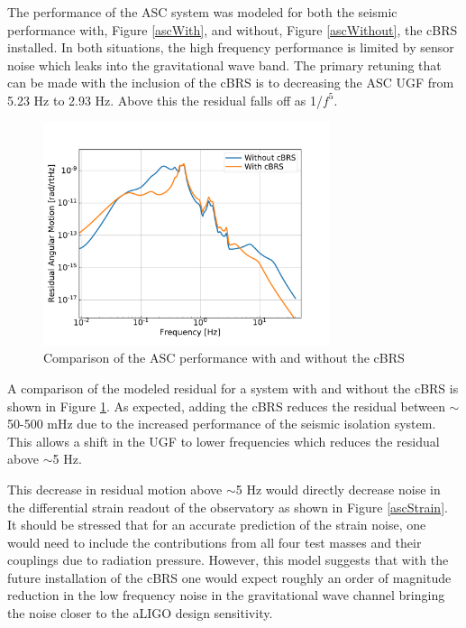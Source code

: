 \documentclass [12pt, proquest]{uwthesis}[2019]
\begin{document}
The performance of the ASC system was modeled for both the seismic performance with, Figure \ref{ascWith}, and without, Figure \ref{ascWithout}, the cBRS installed. In both situations, the high frequency performance is limited by sensor noise which leaks into the gravitational wave band. The primary retuning that can be made with the inclusion of the cBRS is to decreasing the ASC UGF from 5.23 Hz to 2.93 Hz. Above this the residual falls off as 1/$f^5$.

\begin{figure}[!h]
\begin{center}
\includegraphics[width=0.75\textwidth]{cBRS_ASC_LowF.pdf}
\caption[Comparison of the ASC performance with and without the cBRS]{Comparison of the ASC performance with and without the cBRS}
\label{ascComp}
\end{center}
\end{figure}

A comparison of the modeled residual for a system with and without the cBRS is shown in Figure \ref{ascComp}. As expected, adding the cBRS reduces the residual between $\sim$50-500 mHz due to the increased performance of the seismic isolation system. This allows a shift in the UGF to lower frequencies which reduces the residual above $\sim$5 Hz. 

This decrease in residual motion above $\sim$5 Hz would directly decrease noise in the differential strain readout of the observatory as shown in Figure \ref{ascStrain}. It should be stressed that for an accurate prediction of the strain noise, one would need to include the contributions from all four test masses and their couplings due to radiation pressure. However, this model suggests that with the future installation of the cBRS one would expect roughly an order of magnitude reduction in the low frequency noise in the gravitational wave channel bringing the noise closer to the aLIGO design sensitivity.
\end{document}
